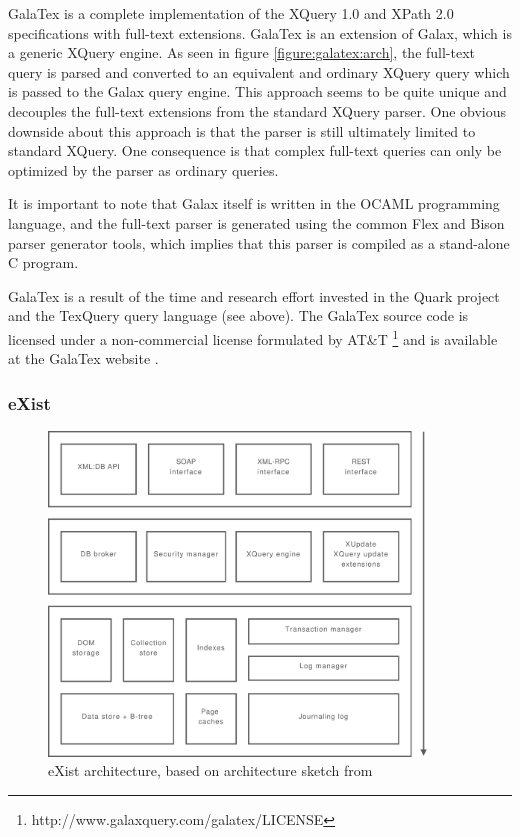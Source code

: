 GalaTex is a complete implementation of the XQuery 1.0 and XPath 2.0
specifications with full-text extensions. GalaTex is an extension of Galax,
which is a generic XQuery engine. As seen in figure \ref{figure:galatex:arch}, 
the full-text query is parsed and converted to an equivalent and ordinary XQuery
query which is passed to the Galax query engine. This approach seems to be quite
unique and decouples the full-text extensions from the standard XQuery parser.
One obvious downside about this approach is that the parser is still ultimately
limited to standard XQuery. One consequence is that complex full-text queries
can only be optimized by the parser as ordinary queries.

It is important to note that Galax itself is written in the OCAML programming
language, and the full-text parser is generated using the common Flex and Bison
parser generator tools, which implies that this parser is compiled as a
stand-alone C program.

GalaTex is a result of the time and research effort invested in the Quark
project and the TexQuery query language (see above). The GalaTex
source code is licensed under a non-commercial license formulated by AT\&{}T 
\footnote{http://www.galaxquery.com/galatex/LICENSE} and is available at the
GalaTex website \cite{galatex}.

\subsubsection{eXist}
\label{sect:stateOfTheArt:eXist}

\begin{figure}[!h]
  \centering
    \includegraphics[width=0.9\textwidth]{diagrams/exist_arch}
  \caption[eXist architecture]{eXist architecture, based on architecture sketch
  from \cite{exist_indexdriven}}
\end{figure}

